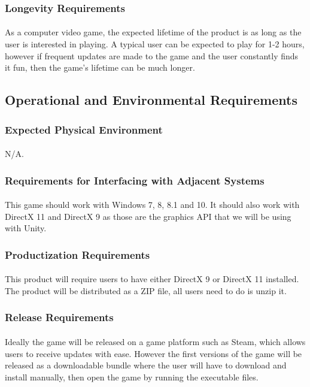 \documentclass[12pt, titlepage]{article}
\begin{document}
\subsubsection{Longevity Requirements}
\paragraph{}As a computer video game, the expected lifetime of the product is as long as the user is interested in playing. A typical user can be expected to play for 1-2 hours, however if frequent updates are made to the game and the user constantly finds it fun, then the game's lifetime can be much longer. 
\subsection{Operational and Environmental Requirements}
\subsubsection{Expected Physical Environment}
\paragraph{}N/A.
\subsubsection{Requirements for Interfacing with Adjacent Systems}
\paragraph{}This game should work with Windows 7, 8, 8.1 and 10. It should also work with DirectX 11 and DirectX 9 as those are the graphics API that we will be using with Unity. 
\subsubsection{Productization Requirements}
\paragraph{}This product will require users to have either DirectX 9 or DirectX 11 installed. The product will be distributed as a ZIP file, all users need to do is unzip it.
\subsubsection{Release Requirements}
\paragraph{}Ideally the game will be released on a game platform such as Steam, which allows users to receive updates with ease. However the first versions of the game will be released as a downloadable bundle where the user will have to download and install manually, then open the game by running the executable files. 
\end{document}
